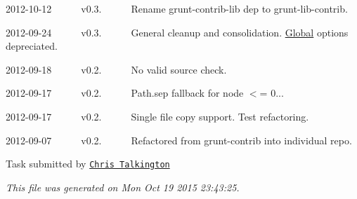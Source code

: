 \begin{DoxyItemize}
\item 2012-\/10-\/12   v0.3.   \+Rename grunt-\/contrib-\/lib dep to grunt-\/lib-\/contrib.
\item 2012-\/09-\/24   v0.3.   \+General cleanup and consolidation. \hyperlink{class_global}{Global} options depreciated.
\item 2012-\/09-\/18   v0.2.   \+No valid source check.
\item 2012-\/09-\/17   v0.2.   \+Path.\+sep fallback for node $<$= 0...
\item 2012-\/09-\/17   v0.2.   \+Single file copy support. Test refactoring.
\item 2012-\/09-\/07   v0.2.   \+Refactored from grunt-\/contrib into individual repo. 


\end{DoxyItemize}

Task submitted by \href{http://christalkington.com/}{\tt Chris Talkington}

{\itshape This file was generated on Mon Oct 19 2015 23\+:43\+:25.} 